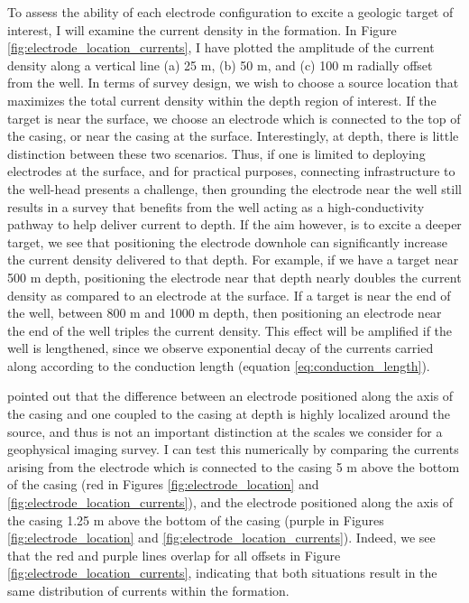 

To assess the ability of each electrode configuration to excite a geologic target of interest, I will examine the current density in the formation. In Figure \ref{fig:electrode_location_currents}, I have plotted the amplitude of the current density along a vertical line (a) 25 m, (b) 50 m, and (c) 100 m radially offset from the well. In terms of survey design, we wish to choose a source location that maximizes the total current density within the depth region of interest. If the target is near the surface, we choose an electrode which is connected to the top of the casing, or near the casing at the surface. Interestingly, at depth, there is little distinction between these two scenarios. Thus, if one is limited to deploying electrodes at the surface, and for practical purposes, connecting infrastructure to the well-head presents a challenge, then grounding the electrode near the well still results in a survey that benefits from the well acting as a high-conductivity pathway to help deliver current to depth. If the aim however, is to excite a deeper target, we see that positioning the electrode downhole can significantly increase the current density delivered to that depth. For example, if we have a target near 500 m depth, positioning the electrode near that depth nearly doubles the current density as compared to an electrode at the surface. If a target is near the end of the well, between 800 m and 1000 m depth, then positioning an electrode near the end of the well triples the current density. This effect will be amplified if the well is lengthened, since we observe exponential decay of the currents carried along according to the conduction length (equation \ref{eq:conduction_length}).





\cite{Kaufman1990} pointed out that the difference between an electrode positioned along the axis of the casing and one coupled to the casing at depth is highly localized around the source, and thus is not an important distinction at the scales we consider for a geophysical imaging survey. I can test this numerically by comparing the currents arising from the electrode which is connected to the casing 5 m above the bottom of the casing (red in Figures \ref{fig:electrode_location} and \ref{fig:electrode_location_currents}), and the electrode positioned along the axis of the casing 1.25 m above the bottom of the casing (purple in Figures \ref{fig:electrode_location} and \ref{fig:electrode_location_currents}). Indeed, we see that the red and purple lines overlap for all offsets in Figure \ref{fig:electrode_location_currents}, indicating that both situations result in the same distribution of currents within the formation.

